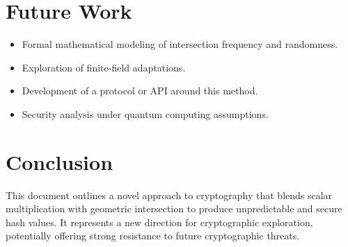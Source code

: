 \documentclass{article}
\begin{document}
\section{Future Work}
\begin{itemize}
  \item Formal mathematical modeling of intersection frequency and randomness.
  \item Exploration of finite-field adaptations.
  \item Development of a protocol or API around this method.
  \item Security analysis under quantum computing assumptions.
\end{itemize}

\section{Conclusion}
This document outlines a novel approach to cryptography that blends scalar multiplication with geometric intersection to produce unpredictable and secure hash values. It represents a new direction for cryptographic exploration, potentially offering strong resistance to future cryptographic threats.
\end{document}
